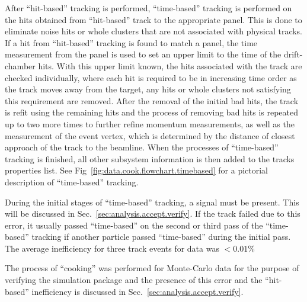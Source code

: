 After ``hit-based'' tracking is performed, ``time-based'' tracking is performed on the hits obtained from ``hit-based'' track to the appropriate  panel. This is done to eliminate noise hits or whole clusters that are not associated with physical tracks. If a hit from ``hit-based'' tracking is found to match a  panel, the time measurement from the  panel is used to set an upper limit to the time of the drift-chamber hits. With this upper limit known, the  hits associated with the track are checked individually, where each hit is required to be in increasing time order as the track moves away from the target, any hits or whole clusters not satisfying this requirement are removed. After the removal of the initial bad hits, the track is refit using the remaining hits and the process of removing bad hits is repeated up to two more times to further refine momentum measurements, as well as the measurement of the event vertex, which is determined by the distance of closest approach of the track to the beamline. When the processes of ``time-based'' tracking is finished, all other subsystem information is then added to the tracks properties list. See Fig~\ref{fig:data.cook.flowchart.timebased} for a pictorial description of ``time-based'' tracking. 

During the initial stages of ``time-based'' tracking, a  signal must be present. This will be discussed in Sec.~\ref{sec:analysis.accept.verify}.  If the track failed due to this error, it usually passed ``time-based'' on the second or third pass of the ``time-based'' tracking if another particle passed ``time-based'' during the initial pass. The average inefficiency for three track events for data was $<0.01$\%

The process of ``cooking'' was performed for Monte-Carlo data for the purpose of verifying the simulation package and the presence of this error and the ``hit-based'' inefficiency is discussed in Sec.~\ref{sec:analysis.accept.verify}.

